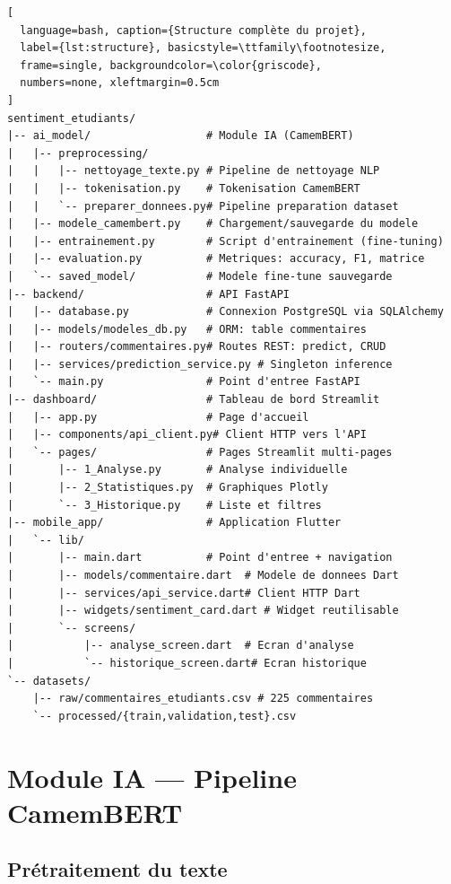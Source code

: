\begin{lstlisting}[
  language=bash, caption={Structure complète du projet},
  label={lst:structure}, basicstyle=\ttfamily\footnotesize,
  frame=single, backgroundcolor=\color{griscode},
  numbers=none, xleftmargin=0.5cm
]
sentiment_etudiants/
|-- ai_model/                  # Module IA (CamemBERT)
|   |-- preprocessing/
|   |   |-- nettoyage_texte.py # Pipeline de nettoyage NLP
|   |   |-- tokenisation.py    # Tokenisation CamemBERT
|   |   `-- preparer_donnees.py# Pipeline preparation dataset
|   |-- modele_camembert.py    # Chargement/sauvegarde du modele
|   |-- entrainement.py        # Script d'entrainement (fine-tuning)
|   |-- evaluation.py          # Metriques: accuracy, F1, matrice
|   `-- saved_model/           # Modele fine-tune sauvegarde
|-- backend/                   # API FastAPI
|   |-- database.py            # Connexion PostgreSQL via SQLAlchemy
|   |-- models/modeles_db.py   # ORM: table commentaires
|   |-- routers/commentaires.py# Routes REST: predict, CRUD
|   |-- services/prediction_service.py # Singleton inference
|   `-- main.py                # Point d'entree FastAPI
|-- dashboard/                 # Tableau de bord Streamlit
|   |-- app.py                 # Page d'accueil
|   |-- components/api_client.py# Client HTTP vers l'API
|   `-- pages/                 # Pages Streamlit multi-pages
|       |-- 1_Analyse.py       # Analyse individuelle
|       |-- 2_Statistiques.py  # Graphiques Plotly
|       `-- 3_Historique.py    # Liste et filtres
|-- mobile_app/                # Application Flutter
|   `-- lib/
|       |-- main.dart          # Point d'entree + navigation
|       |-- models/commentaire.dart  # Modele de donnees Dart
|       |-- services/api_service.dart# Client HTTP Dart
|       |-- widgets/sentiment_card.dart # Widget reutilisable
|       `-- screens/
|           |-- analyse_screen.dart  # Ecran d'analyse
|           `-- historique_screen.dart# Ecran historique
`-- datasets/
    |-- raw/commentaires_etudiants.csv # 225 commentaires
    `-- processed/{train,validation,test}.csv
\end{lstlisting}

\section{Module IA — Pipeline CamemBERT}

\subsection{Prétraitement du texte}

